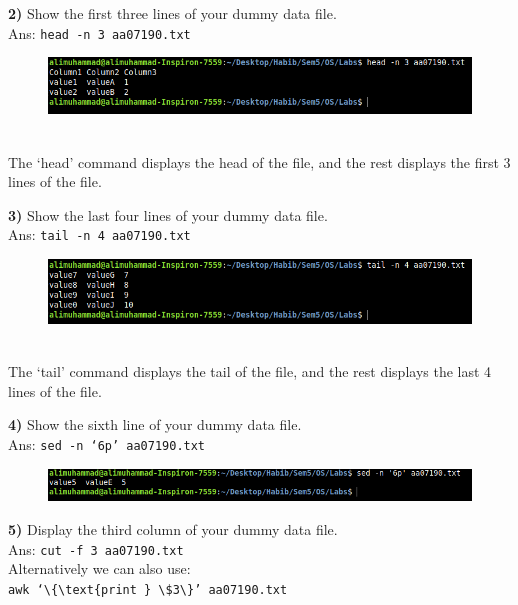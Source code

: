 \documentclass{article}
\theoremstyle{mytheoremstyle}
\theoremstyle{mytheoremstyle}
\theoremstyle{myproblemstyle}
\begin{document}
\pagebreak
\textbf{2)} Show the first three lines of your dummy data file. \\
Ans: \texttt{head -n 3 aa07190.txt}
\begin{figure}[htbp]
    \includegraphics[width=1.0\textwidth]{lab2_2.png}
\end{figure} \\ 
The `head' command displays the head of the file, and the rest displays the first 3 lines of the file.

\vspace*{10mm}
\textbf{3)} Show the last four lines of your dummy data file. \\
Ans: \texttt{tail -n 4 aa07190.txt}
\begin{figure}[htbp]
    \includegraphics[width=1.0\textwidth]{lab2_3.png}
\end{figure} \\
The `tail' command displays the tail of the file, and the rest displays the last 4 lines of the file.

\vspace*{10mm}
\textbf{4)} Show the sixth line of your dummy data file. \\
Ans: \texttt{sed -n `6p' aa07190.txt}
\begin{figure}[htbp]
    \includegraphics[width=1.0\textwidth]{lab2_4.png}
\end{figure}

\pagebreak
\textbf{5)} Display the third column of your dummy data file. \\
Ans: \texttt{cut -f 3 aa07190.txt} \\ Alternatively we can also use: \\ \texttt{awk `$\{\text{print } \$3\}$' aa07190.txt}
\end{document}
